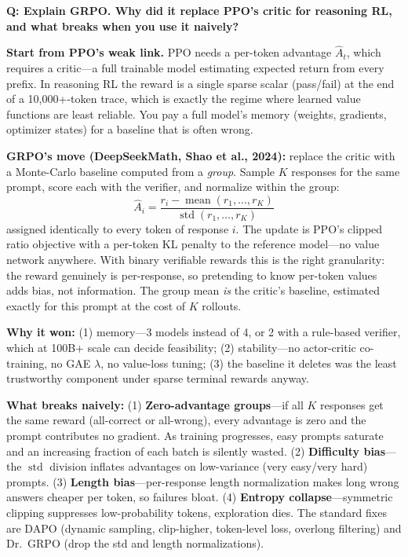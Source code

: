 
\begin{interviewq}
\textbf{Q: Explain GRPO. Why did it replace PPO's critic for reasoning RL, and what breaks when you use it naively?}

 \quad {} \quad \badgefreq{\freqhigh}

\stronganswer

\textbf{Start from PPO's weak link.} PPO needs a per-token advantage $\hat{A}_t$, which requires a critic---a full trainable model estimating expected return from every prefix. In reasoning RL the reward is a single sparse scalar (pass/fail) at the end of a 10{,}000+-token trace, which is exactly the regime where learned value functions are least reliable. You pay a full model's memory (weights, gradients, optimizer states) for a baseline that is often wrong.

\textbf{GRPO's move (DeepSeekMath, Shao et al., 2024):} replace the critic with a Monte-Carlo baseline computed from a \textit{group}. Sample $K$ responses for the same prompt, score each with the verifier, and normalize within the group:
\begin{equation*}
\hat{A}_i = \frac{r_i - \operatorname{mean}(r_1, \ldots, r_K)}{\operatorname{std}(r_1, \ldots, r_K)}
\end{equation*}
assigned identically to every token of response $i$. The update is PPO's clipped ratio objective with a per-token KL penalty to the reference model---no value network anywhere. With binary verifiable rewards this is the right granularity: the reward genuinely is per-response, so pretending to know per-token values adds bias, not information. The group mean \textit{is} the critic's baseline, estimated exactly for this prompt at the cost of $K$ rollouts.

\textbf{Why it won:} (1) memory---3 models instead of 4, or 2 with a rule-based verifier, which at 100B+ scale can decide feasibility; (2) stability---no actor-critic co-training, no GAE $\lambda$, no value-loss tuning; (3) the baseline it deletes was the least trustworthy component under sparse terminal rewards anyway.

\textbf{What breaks naively:} (1) \textbf{Zero-advantage groups}---if all $K$ responses get the same reward (all-correct or all-wrong), every advantage is zero and the prompt contributes no gradient. As training progresses, easy prompts saturate and an increasing fraction of each batch is silently wasted. (2) \textbf{Difficulty bias}---the $\operatorname{std}$ division inflates advantages on low-variance (very easy/very hard) prompts. (3) \textbf{Length bias}---per-response length normalization makes long wrong answers cheaper per token, so failures bloat. (4) \textbf{Entropy collapse}---symmetric clipping suppresses low-probability tokens, exploration dies. The standard fixes are DAPO (dynamic sampling, clip-higher, token-level loss, overlong filtering) and Dr.~GRPO (drop the std and length normalizations).


\end{interviewq}
